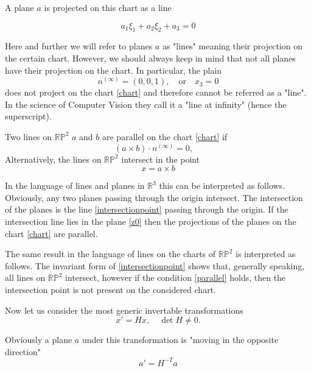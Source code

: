 \documentclass[a4paper,10pt]{article}
\begin{document}
A plane $a$ is projected on this chart as a line

\begin{equation}
a_1 \xi_1 + a_2 \xi_2 + a_3 = 0
\end{equation} 

Here and further we will refer to planes $a$ as "lines" meaning their projection on the certain chart. However, we should always keep in mind that not all planes have their projection on the chart. In particular, the plain 
\begin{equation}
n^{(\infty)} = (0,0,1), \quad \text{or} \quad x_3 = 0\label{z0}
\end{equation}
does not project on the chart \eqref{chart} and therefore cannot be referred as a "line". In the science of Computer Vision they call it a "line at infinity" (hence the superscript).

Two lines on $\mathbb{RP}^2$ $a$ and $b$ are parallel on the chart  \eqref{chart} if 
\begin{equation}
(a\times b )\cdot n^{(\infty)} = 0, \quad \label{parallel}
\end{equation}
Alternatively, the lines on $\mathbb{RP}^2$ intersect in the point 
\begin{equation}
x = a \times b\label{intersectionpoint}
\end{equation}

In the language of lines and planes in $\mathbb{R}^3$ this can be interpreted as follows. Obviously, any two planes passing through the origin intersect. The intersection of the planes is the line \eqref{intersectionpoint} passing through the origin. If the intersection line lies in the plane \eqref{z0} then the projections of the planes on the chart \eqref{chart} are parallel.

The same result in the language of lines on the charts of $\mathbb{RP}^2$ is interpreted as  follows. The invariant form of \eqref{intersectionpoint} shows that, generally speaking, all lines on $\mathbb{RP}^2$ intersect, however if the condition \eqref{parallel} holds, then the intersection point is not  present on the considered chart.

Now let us consider the most generic invertable transformations 
\begin{equation}
x' = H x, \quad \det H \neq 0. 
\end{equation}

Obviously a plane $a$ under this transformation  is "moving in the opposite direction"
\begin{equation}
a'=H^{-T}a\label{cotransform}
\end{equation}
\end{document}
